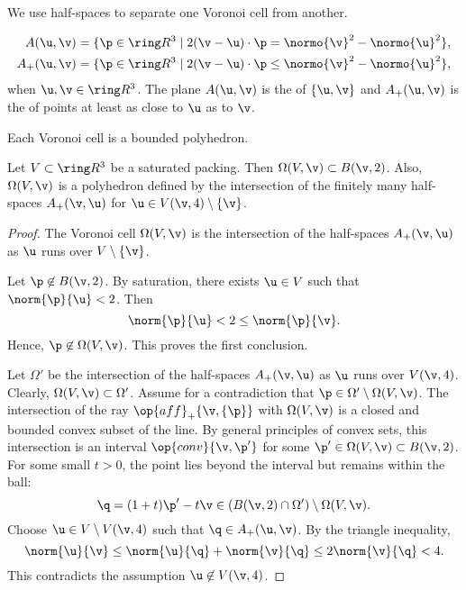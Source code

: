 \begin{cnl}
We use half-spaces to separate one Voronoi cell from another.

\begin{definition}\label{def:half-space}
\begin{align*} 
\AA{\u}{\v} &= \setcomp{\p\in\vecR{3} }{ 2(\v-\u)\cdot \p = \normo{\v}^2 - \normo{\u}^2 },\\
\Aplus(\u,\v) &= \setcomp{\p\in\vecR{3} }{ 2(\v-\u)\cdot \p \le \normo{\v}^2 - \normo{\u}^2 },
\end{align*}
when $\u,\v\in\vecR{3}$.  The plane $\AA{\u}{\v}$ is the  of
$\braced{\u,\v}$ and $\Aplus(\u,\v)$ is the  of points at least as
close to $\u$ as to $\v$.  
\end{definition}
%
%

Each Voronoi cell is a bounded polyhedron.

\begin{lemma}
\label{lemma:Voronoi-polyhedron} 
  Let $V\subset\vecR{3}$ be a saturated packing.  Then
  $\Omega(V,\v)\subset \openBall{\v}{2}$.  Also, $\Omega(V,\v)$ is a polyhedron
  defined by the intersection of the finitely many half-spaces
  $\Aplus(\v,\u)$ for $\u\in \Vee{V}(\v,4)\setminus\braced{\v}$.
\end{lemma}

\begin{proof} 
The Voronoi cell $\Omega(V,\v)$ is the
intersection of the half-spaces $\Aplus(\v,\u)$ as $\u$ runs over
$V\setminus \braced{\v}$.

Let $\p\not\in \openBall{\v}{2}$.  
By saturation, there exists $\u\in V$ such that $\norm{\p}{\u}<2$.
Then 
\[  
\norm{\p}{\u} < 2 \le \norm{\p}{\v}.
\] 
Hence, $\p\not\in\Omega(V,\v)$.  This proves the first conclusion.


Let $\Omega'$ be the intersection of the half-spaces $\Aplus(\v,\u)$ as
$\u$ runs over $\Vee{V}(\v,4)$.  Clearly, $\Omega(V,\v)\subset \Omega'$.
Assume for a contradiction that $\p\in \Omega'\setminus\Omega(V,\v)$.
The intersection of the ray $\op{aff}_+\braced{\v,\{\p\}}$ with
$\Omega(V,\v)$ is a closed and bounded convex subset of the line.  By
general principles of convex sets, this intersection is an interval
$\op{conv}\braced{\v,\p'}$ for some $\p'\in\Omega(V,\v)\subset \openBall{\v}{2}$.
For some small $t>0$, the point lies beyond the interval but remains
within the ball:
\[  
\q = (1+t)\p' -t \v\in (\openBall{\v}{2}\cap \Omega')\setminus \Omega(V,\v).
\] 
Choose $\u\in V\setminus \Vee{V}(\v,4)$ such that $\q\in \Aplus(\u,\v)$.  By the
triangle inequality,
\[  
\norm{\u}{\v} \le \norm{\u}{\q} + \norm{\v}{\q} \le 2\norm{\v}{\q} < 4.
\] 
This contradicts the assumption $\u\not\in \Vee{V}(\v,4)$.


\end{proof}
\end{cnl}
